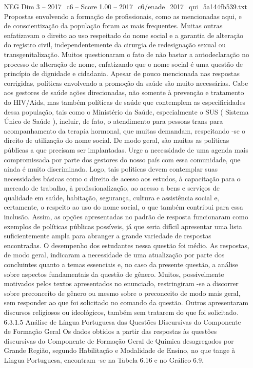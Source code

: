 \begin{textsample}{NEG Dim 3 – 2017\_c6 – Score 1.00 – 2017\_c6/enade\_2017\_qui\_5a144fb539.txt}
Propostas envolvendo a formação de profissionais, como as mencionadas aqui, e de conscientização da população foram as mais frequentes.
Muitas outras enfatizavam o direito ao uso respeitado do nome social e a garantia de alteração do registro civil, independentemente da cirurgia de redesignação sexual ou transgenitalização.
Muitos questionaram o fato de não bastar a autodeclaração no processo de alteração de nome, enfatizando que o nome social é uma questão de princípio de dignidade e cidadania.
Apesar de pouco mencionada nas respostas corrigidas, políticas envolvendo a promoção da saúde são muito necessárias.
Cabe aos gestores de saúde ações direcionadas, não somente à prevenção e tratamento do HIV/Aids, mas também políticas de saúde que contemplem as especificidades dessa população, tais como o Ministério da Saúde, especialmente o SUS ( Sistema Único de Saúde ), incluir, de fato, o atendimento para pessoas trans para acompanhamento da terapia hormonal, que muitas demandam, respeitando -se o direito de utilização do nome social.
De modo geral, são muitas as políticas públicas a que precisam ser implantadas.
Urge a necessidade de uma agenda mais compromissada por parte dos gestores do nosso país com essa comunidade, que ainda é muito discriminada.
Logo, tais políticas devem contemplar suas necessidades básicas como o direito de acesso aos estudos, à capacitação para o mercado de trabalho, à profissionalização, ao acesso a bens e serviços de qualidade em saúde, habitação, segurança, cultura e assistência social e, certamente, o respeito ao uso do nome social, o que também contribui para essa inclusão.
Assim, as opções apresentadas no padrão de resposta funcionaram como exemplos de políticas públicas possíveis, já que seria difícil apresentar uma lista suficientemente ampla para abranger a grande variedade de respostas encontradas.
O desempenho dos estudantes nessa questão foi médio.
As respostas, de modo geral, indicaram a necessidade de uma atualização por parte dos concluintes quanto a temas essenciais e, no caso da presente questão, a análise sobre aspectos fundamentais da questão de gênero.
Muitos, possivelmente motivados pelos textos apresentados no enunciado, restringiram -se a discorrer sobre preconceito de gênero ou mesmo sobre o preconceito de modo mais geral, sem responder ao que foi solicitado no comando da questão.
Outros apresentaram discursos religiosos ou ideológicos, também sem tratarem do que foi solicitado. 6.3.1.5 Análise de Língua Portuguesa das Questões Discursivas do Componente de Formação Geral Os dados obtidos a partir das respostas às questões discursivas do Componente de Formação Geral de Química desagregados por Grande Região, segundo Habilitação e Modalidade de Ensino, no que tange à Língua Portuguesa, encontram -se na Tabela 6.16 e no Gráfico 6.9.

\end{textsample}
